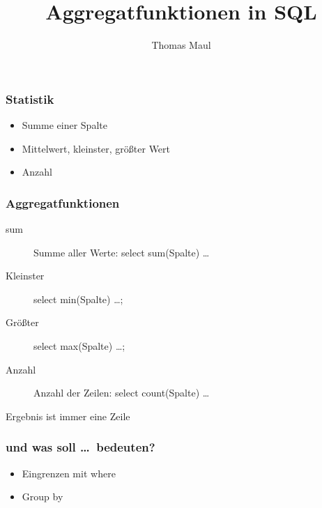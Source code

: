 \documentclass[aspectratio=169]{beamer}
\title{Aggregatfunktionen in SQL}
\author{Thomas Maul}
\institute[BWS Hofheim]{Brühlwiesenschule, Hofheim}
\begin{document}
\begin{frame}
  \titlepage
\end{frame}
\begin{frame}
  \frametitle{Statistik}
  \begin{itemize}
    \item Summe einer Spalte
    \item Mittelwert, kleinster, größter Wert
    \item Anzahl
  \end{itemize}
\end{frame}

\begin{frame}
  \frametitle{Aggregatfunktionen}
  \begin{description}
    \item[sum] Summe aller Werte: select sum(Spalte) \dots
    \item[Kleinster] select min(Spalte) \dots;
    \item[Größter] select max(Spalte) \dots;
    \item[Anzahl] Anzahl der Zeilen: select count(Spalte) \dots
  \end{description}
  Ergebnis ist immer eine Zeile
\end{frame}

\begin{frame}
  \frametitle{und was soll \dots\  bedeuten?}
  \begin{itemize}
    \item Eingrenzen mit where
    \item Group by
  \end{itemize}
\end{frame}

  
\end{document}

